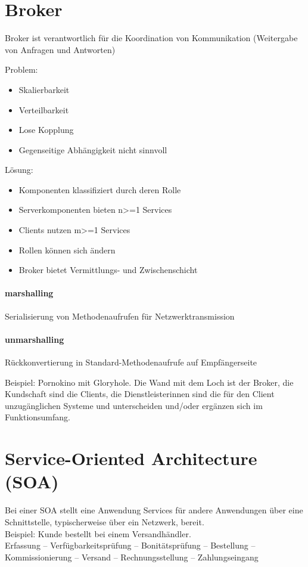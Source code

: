 \section{Broker}\label{broker}

Broker ist verantwortlich für die Koordination von Kommunikation
(Weitergabe von Anfragen und Antworten)

Problem:

\begin{itemize}
\itemsep1pt\parskip0pt
\item
  Skalierbarkeit
\item
  Verteilbarkeit
\item
  Lose Kopplung
\item
  Gegenseitige Abhängigkeit nicht sinnvoll
\end{itemize}

Lösung:

\begin{itemize}
\itemsep1pt\parskip0pt
\item
  Komponenten klassifiziert durch deren Rolle
\item
  Serverkomponenten bieten n\textgreater{}=1 Services
\item
  Clients nutzen m\textgreater{}=1 Services
\item
  Rollen können sich ändern
\item
  Broker bietet Vermittlungs- und Zwischenschicht
\end{itemize}

\paragraph{marshalling}\label{marshalling}

Serialisierung von Methodenaufrufen für Netzwerktransmission

\paragraph{unmarshalling}\label{unmarshalling}

Rückkonvertierung in Standard-Methodenaufrufe auf Empfängerseite

Beispiel: Pornokino mit Gloryhole. Die Wand mit dem Loch ist der Broker,
die Kundschaft sind die Clients, die Dienstleisterinnen sind die für den
Client unzugänglichen Systeme und unterscheiden und/oder ergänzen sich
im Funktionsumfang.

\section{Service-Oriented Architecture
(SOA)}\label{service-oriented-architecture-soa}
Bei einer SOA stellt eine Anwendung Services für andere Anwendungen über eine
Schnittstelle, typischerweise über ein Netzwerk, bereit.\\
Beispiel: Kunde bestellt bei einem Versandhändler.\\
Erfassung $–$ Verfügbarkeitsprüfung $–$ Bonitätsprüfung $–$ Bestellung $–$\\
Kommissionierung $–$ Versand $–$ Rechnungsstellung $–$ Zahlungseingang

